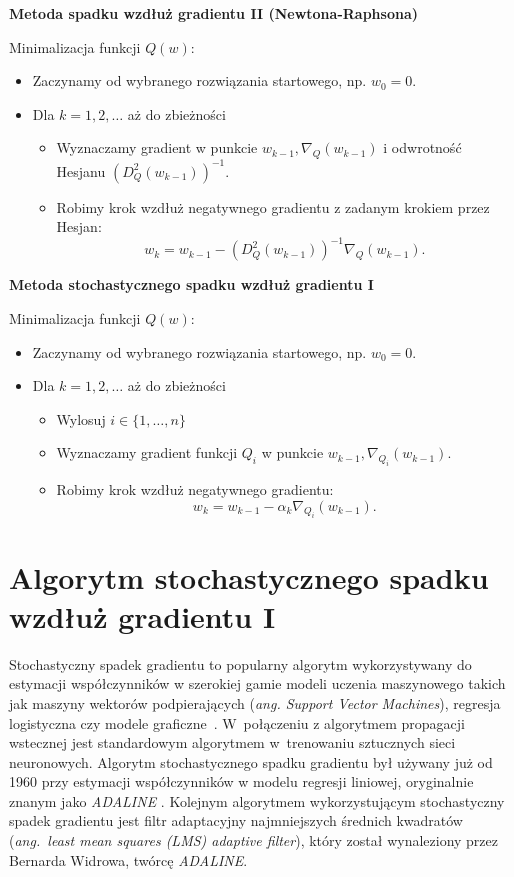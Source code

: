\begin{center}
\textbf{Metoda spadku wzdłuż gradientu II (Newtona-Raphsona)}
\end{center}
Minimalizacja funkcji $Q(w)$:
\begin{itemize}
\item Zaczynamy od wybranego rozwiązania startowego, np. $w_{0} = 0$.
\item Dla $k = 1, 2, \dots$ aż do zbieżności
	\begin{itemize}
	\item Wyznaczamy gradient w punkcie $w_{k-1}, \nabla_{Q}(w_{k-1})$ i odwrotność Hesjanu $(D_{Q}^{2}(w_{k-1}))^{-1}$.
	\item Robimy krok wzdłuż negatywnego gradientu z zadanym krokiem przez Hesjan: $$w_{k} = w_{k-1} - (D_{Q}^{2}(w_{k-1}))^{-1}\nabla_{Q}(w_{k-1}). $$
	\end{itemize}
\end{itemize}
\begin{center}
\textbf{Metoda stochastycznego spadku wzdłuż gradientu I}
\end{center}
Minimalizacja funkcji $Q(w)$:
\begin{itemize}
\item Zaczynamy od wybranego rozwiązania startowego, np. $w_{0} = 0$.
\item Dla $k = 1, 2, \dots$ aż do zbieżności
	\begin{itemize}
	\item Wylosuj $i \in \{1,\dots,n\}$
	\item Wyznaczamy gradient funkcji $Q_{i}$ w punkcie $w_{k-1}, \nabla_{Q_{i}}(w_{k-1})$.
	\item Robimy krok wzdłuż negatywnego gradientu: 
	\begin{equation}\label{sgdrownanie}
	 w_{k} = w_{k-1} - \alpha_{k}\nabla_{Q_{i}}(w_{k-1}).
	  \end{equation}
	\end{itemize}
\end{itemize}

\section{Algorytm stochastycznego spadku wzdłuż gradientu I}\label{SGD}
Stochastyczny spadek gradientu to popularny algorytm wykorzystywany do estymacji współczynników w szerokiej gamie modeli uczenia maszynowego takich jak maszyny wektorów podpierających (\textit{ang. Support Vector Machines}), regresja logistyczna czy modele graficzne~\cite{finkel}. W~połączeniu z algorytmem propagacji wstecznej jest standardowym algorytmem w~trenowaniu sztucznych sieci neuronowych. Algorytm stochastycznego spadku gradientu był używany już od 1960 przy estymacji współczynników w modelu regresji liniowej, oryginalnie znanym jako \textit{ADALINE} \cite{ADALINE}. Kolejnym algorytmem wykorzystującym stochastyczny spadek gradientu jest filtr adaptacyjny najmniejszych średnich kwadratów \cite{widrow2} (\textit{ang.~least mean squares (LMS) adaptive filter}), który został wynaleziony przez Bernarda Widrowa, twórcę \textit{ADALINE}.

